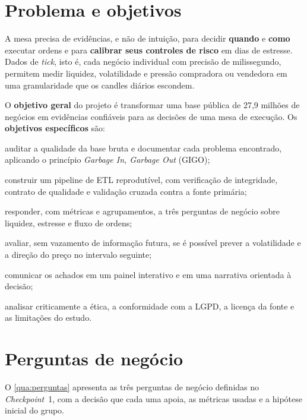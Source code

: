 \section{Problema e objetivos}\label{sec:objetivos}

A mesa precisa de evidências, e não de intuição, para decidir \textbf{quando}
e \textbf{como} executar ordens e para \textbf{calibrar seus controles de risco}
em dias de estresse. Dados de \textit{tick}, isto é, cada negócio individual com
precisão de milissegundo, permitem medir liquidez, volatilidade e pressão
compradora ou vendedora em uma granularidade que os candles diários escondem.

O \textbf{objetivo geral} do projeto é transformar uma base pública de
27,9 milhões de negócios em evidências confiáveis para as decisões de uma mesa
de execução. Os \textbf{objetivos específicos} são:

\begin{alineas}
  \item auditar a qualidade da base bruta e documentar cada problema encontrado,
        aplicando o princípio \textit{Garbage In, Garbage Out} (GIGO);
  \item construir um pipeline de ETL reprodutível, com verificação de
        integridade, contrato de qualidade e validação cruzada contra a fonte
        primária;
  \item responder, com métricas e agrupamentos, a três perguntas de negócio
        sobre liquidez, estresse e fluxo de ordens;
  \item avaliar, sem vazamento de informação futura, se é possível prever a
        volatilidade e a direção do preço no intervalo seguinte;
  \item comunicar os achados em um painel interativo e em uma narrativa
        orientada à decisão;
  \item analisar criticamente a ética, a conformidade com a LGPD, a licença da
        fonte e as limitações do estudo.
\end{alineas}

\section{Perguntas de negócio}\label{sec:perguntas}

O \autoref{qua:perguntas} apresenta as três perguntas de negócio definidas no
\textit{Checkpoint}~1, com a decisão que cada uma apoia, as métricas usadas e a
hipótese inicial do grupo.

